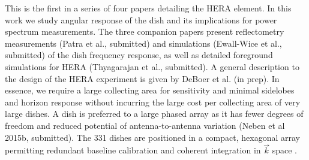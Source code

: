 \documentclass{emulateapj}
\begin{document}

This is the first in a series of four papers detailing the HERA element. In this work we study 
angular response of the dish and its implications for power spectrum measurements. The three companion 
papers present reflectometry measurements (Patra et al., submitted) and simulations (Ewall-Wice et al., 
submitted) of the dish frequency response, as well as detailed 
foreground simulations for HERA (Thyagarajan et al., submitted). A general description to the design of the 
HERA experiment is given by DeBoer et al. (in prep). In essence, we 
require a large collecting area for
 sensitivity and minimal sidelobes and horizon response without incurring the large cost per collecting 
area of very large dishes. A dish is preferred to a large phased array as it has fewer degrees 
of freedom and reduced potential of antenna-to-antenna variation (Neben et al 2015b, 
submitted). The 331 dishes are positioned in a compact, hexagonal 
array permitting redundant baseline calibration and coherent integration in $
\vec{k}$ space \citep{omniscope,parsons12a}. 
\end{document}
